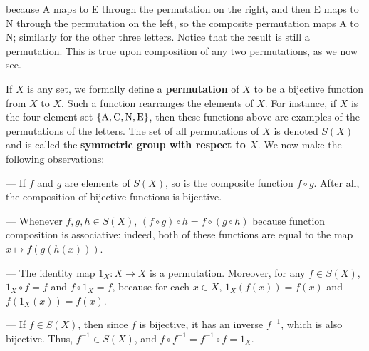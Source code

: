 \documentclass[leqno]{book}
\begin{document}
because A maps to E through the permutation on the right, and then E maps to N through the permutation on the left, so the composite permutation maps A to N; similarly for the other three letters.  Notice that the result is still a permutation.  This is true upon composition of any two permutations, as we now see.

If $X$ is any set, we formally define a \textbf{permutation} of $X$ to be a bijective function from $X$ to $X$.  Such a function rearranges the elements of $X$.  For instance, if $X$ is the four-element set $\{\text A,\text C,\text N,\text E\}$, then these functions above are examples of the permutations of the letters.  The set of all permutations of $X$ is denoted $S(X)$ and is called the \textbf{symmetric group with respect to $X$}.  We now make the following observations:

\---- If $f$ and $g$ are elements of $S(X)$, so is the composite function $f\circ g$.  After all, the composition of bijective functions is bijective.

\---- Whenever $f,g,h\in S(X)$, $(f\circ g)\circ h=f\circ(g\circ h)$ because function composition is associative: indeed, both of these functions are equal to the map $x\mapsto f(g(h(x)))$.

\---- The identity map $1_X:X\to X$ is a permutation.  Moreover, for any $f\in S(X)$, $1_X\circ f=f$ and $f\circ 1_X=f$, because for each $x\in X$, $1_X(f(x))=f(x)$ and $f(1_X(x))=f(x)$.

\---- If $f\in S(X)$, then since $f$ is bijective, it has an inverse $f^{-1}$, which is also bijective.  Thus, $f^{-1}\in S(X)$, and $f\circ f^{-1}=f^{-1}\circ f=1_X$.
\end{document}
